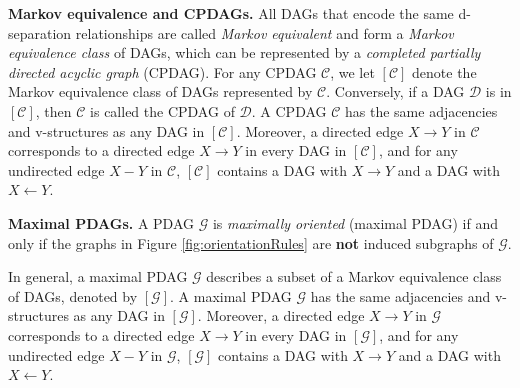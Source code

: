 \documentclass[11pt,a4paper]{article}
\newtheorem{Example}[Satz]{Example}
\theoremstyle{definition}
\theoremstyle{remark}
\newcommand{\mpdag}{maximal PDAG}
\newcommand{\Mpdag}{Maximal PDAG}
\newcommand{\g}[1][G]{\mathcal{#1}}
\newcommand{\vsp}{\vspace{.2cm}}
\begin{document}
\vsp\noindent\textbf{Markov equivalence and CPDAGs.}  \citep[Cf.\ ][]{meek1995causal,andersson1997characterization} All DAGs that encode the same d-separation relationships are called \textit{Markov equivalent} and form a \textit{Markov equivalence class} of DAGs, which can be represented by a \textit{completed partially directed acyclic graph} (CPDAG). For any CPDAG $\g[C]$, we let $[\g[C]]$ denote the Markov equivalence class of DAGs represented by $\g[C]$. Conversely, if a DAG $\g[D]$ is in $[\g[C]]$, then $\g[C]$ is called the CPDAG of $\g[D]$.
A CPDAG $\g[C]$ has the same adjacencies and v-structures as any DAG in $[\g[C]]$. 
Moreover, a directed edge $X\to Y$ in $\g[C]$ corresponds to a directed edge $X \to Y$ in every
DAG in $[\g[C]]$, and for any undirected edge $X -Y$  in $\g[C]$, $[\g[C]]$ contains a DAG with $X \rightarrow Y$ and a DAG with $X \leftarrow Y$. 

\vsp\noindent\textbf{\Mpdag{}s.} A PDAG $\g$ is \textit{maximally oriented} (\mpdag{}) if and only if the graphs in Figure \ref{fig:orientationRules} are \textbf{not} induced subgraphs of $\g$. 

In general, a \mpdag{} $\g$ describes a subset of a Markov equivalence class of DAGs, denoted by $[\g]$.  
A \mpdag{} $\g$ has the same adjacencies and v-structures as any DAG in $[\g]$. 
Moreover, a directed edge $X\to Y$ in $\g$ corresponds to a directed edge $X \to Y$ in every
DAG in $[\g]$, and for any undirected edge $X -Y$  in $\g$, $[\g]$ contains a DAG with $X \rightarrow Y$ and a DAG with $X \leftarrow Y$.

%	
%	
 
\end{document}
